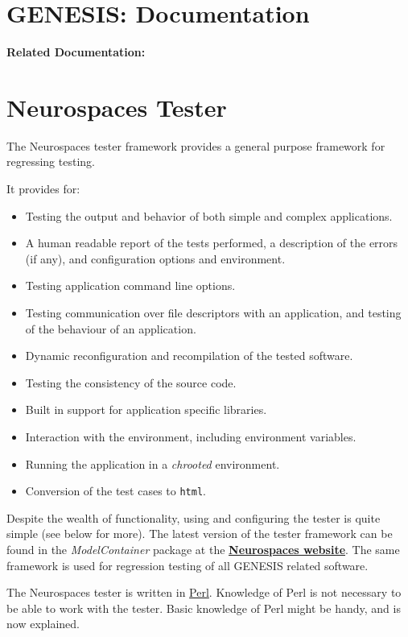 \documentclass[12pt]{article}
\begin{document}
\section*{GENESIS: Documentation}

{\bf Related Documentation:}

\section*{Neurospaces Tester}

The Neurospaces tester framework provides a general purpose framework for regressing testing.

It provides for:
\begin{itemize}
\item Testing the output and behavior of both simple and complex applications.
\item A human readable report of the tests performed, a description of the errors (if any), and configuration options and environment.
\item Testing application command line options.
\item Testing communication over file descriptors with an application, and testing of the behaviour of an application.
\item Dynamic reconfiguration and recompilation of the tested software.
\item Testing the consistency of the source code.
\item Built in support for application specific libraries.
\item Interaction with the environment, including environment variables.
\item Running the application in a {\it chrooted} environment.
\item Conversion of the test cases to {\tt html}. 
\end{itemize}

Despite the wealth of functionality, using and configuring the tester is quite simple (see below for more). The latest version of the tester framework can be found in the {\it ModelContainer} package at the \href{http://www.neurospaces.org/}{\bf Neurospaces website}. The same framework is used for regression testing of all GENESIS related software.

The Neurospaces tester is written in \href{http://www.perl.org/}{Perl}. Knowledge of Perl is not necessary to be able to work with the tester. Basic knowledge of Perl might be handy, and is now explained.
\end{document}
